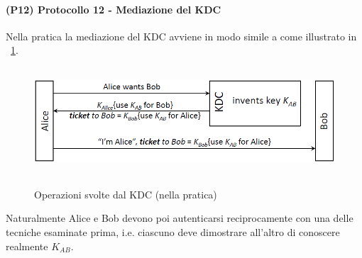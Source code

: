 \paragraph{(P12) Protocollo 12 - Mediazione del KDC}
Nella pratica la mediazione del KDC avviene in modo simile a come illustrato in \figurename~\ref{fig:ImgS97bis}.
\begin{figure}[htbp]
	\centering%
	\subfigure%
	{\includegraphics[height=4cm, width=12cm, keepaspectratio]{Immagini/autenticazione/ImgS97bis.png}}
	\caption{Operazioni svolte dal KDC (nella pratica)}\label{fig:ImgS97bis} 	
\end{figure}
Naturalmente Alice e Bob devono poi autenticarsi reciprocamente con una delle tecniche esaminate prima, i.e. ciascuno deve dimostrare all'altro di conoscere realmente $K_{AB}$.\\ \\
